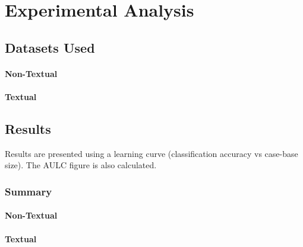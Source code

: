 \documentclass[a4paper,11pt]{report}
\begin{document}
\chapter{Experimental Analysis\label{cha:expanalysis}}
\section{Datasets Used}
\subsubsection{Non-Textual}

\subsubsection{Textual}

\section{Results}
Results are presented using a learning curve (classification accuracy vs case-base size). The AULC figure is also calculated.

\begin{table}
\subsection{Summary}

\subsubsection{Non-Textual}
{\footnotesize {}}

\subsubsection{Textual}
{\footnotesize {}}
\end{table}
\end{document}
